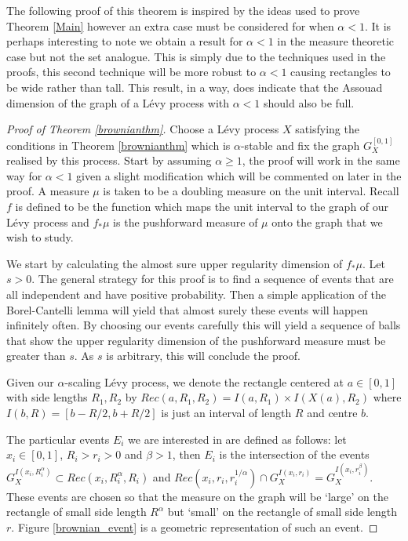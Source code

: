 The following proof of this theorem is inspired by the ideas used to prove Theorem \ref{Main} however an extra case must be considered for when $\alpha < 1$. It is perhaps interesting to note we obtain a result for $\alpha < 1$ in the measure theoretic case but not the set analogue. This is simply due to the techniques used in the proofs, this second technique will be more robust to $\alpha < 1$ causing rectangles to be wide rather than tall. This result, in a way, does indicate that the Assouad dimension of the graph of a L\'evy process with $\alpha < 1$ should also be full.


\begin{proof}[Proof of Theorem \ref{brownianthm}]



Choose a L\'evy process $X$ satisfying the conditions in Theorem \ref{brownianthm} which is $\alpha$-stable and fix the graph $G_X^{[0,1]}$ realised by this process. Start by assuming $\alpha \ge 1$, the proof will work in the same way for $\alpha < 1$ given a slight modification which will be commented on later in the proof. A measure $\mu$ is taken to be a doubling measure on the unit interval. Recall $f$ is defined to be the function which maps the unit interval to the graph of our L\'evy process and $f_*\mu$ is the pushforward measure of $\mu$ onto the graph that we wish to study.

We start by calculating the almost sure upper regularity dimension of $f_*\mu$. Let $s>0$. The general strategy for this proof is to find a sequence of events that are all independent and have positive probability. Then a simple application of the Borel-Cantelli lemma will yield that almost surely these events will happen infinitely often. By choosing our events carefully this will yield a sequence of balls that show the upper regularity dimension of the pushforward measure must be greater than $s$. As $s$ is arbitrary, this will conclude the proof.

Given our $\alpha$-scaling L\'evy process, we denote the rectangle centered at $a\in [0,1]$ with side lengths $R_1,R_2$ by $Rec(a,R_1,R_2) = I(a,R_1) \times I(X(a),R_2)$ where $I(b,R) = [b-R/2,b+R/2]$ is just an interval of length $R$ and centre $b$. 

The particular events $E_i$ we are interested in are defined as follows: let $x_i \in [0,1]$, $R_i > r_i> 0$ and $\beta > 1$, then $E_i$ is the intersection of the events $G_X^{I(x_i,R_i^{\alpha})} \subset Rec(x_i,R_i^{\alpha},R_i)$ and $Rec(x_i, r_i, r_i^{1/\alpha}) \cap G_X^{I(x_i,r_i)} = G_X^{I(x_i,r_i^{\beta})}$. These events are chosen so that the measure on the graph will be `large' on the rectangle of small side length $R^{\alpha}$ but `small' on the rectangle of small side length $r$. Figure \ref{brownian_event} is a geometric representation of such an event.  


\end{proof}
